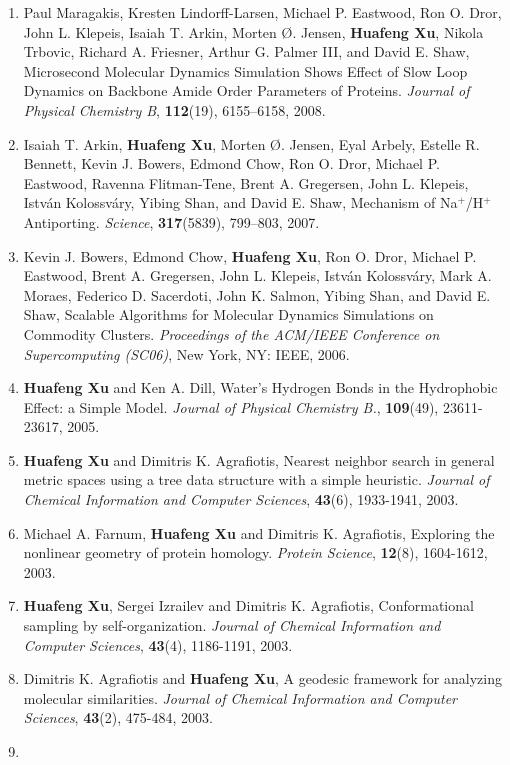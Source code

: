 \documentclass[11pt]{article}
\begin{document}
\begin{enumerate}
\item
Paul Maragakis, Kresten Lindorff-Larsen, Michael P. Eastwood, Ron O. Dror, John L. Klepeis, Isaiah T. Arkin, Morten \O. Jensen, \textbf{Huafeng Xu}, Nikola Trbovic, Richard A. Friesner, Arthur G. Palmer III, and David E. Shaw, Microsecond Molecular Dynamics Simulation Shows Effect of Slow Loop Dynamics on Backbone Amide Order Parameters of Proteins. \textit{Journal of Physical Chemistry B}, \textbf{112}(19), 6155–6158, 2008.
\item
Isaiah T. Arkin, \textbf{Huafeng Xu}, Morten \O. Jensen, Eyal Arbely, Estelle R. Bennett, Kevin J. Bowers, Edmond Chow, Ron O. Dror, Michael P. Eastwood, Ravenna Flitman-Tene, Brent A. Gregersen, John L. Klepeis, István Kolossváry, Yibing Shan, and David E. Shaw, Mechanism of Na$^+$/H$^+$ Antiporting. \textit{Science}, \textbf{317}(5839), 799–803, 2007.
\item
Kevin J. Bowers, Edmond Chow, \textbf{Huafeng Xu}, Ron O. Dror, Michael P. Eastwood, Brent A. Gregersen, John L. Klepeis, István Kolossváry, Mark A. Moraes, Federico D. Sacerdoti, John K. Salmon, Yibing Shan, and David E. Shaw, Scalable Algorithms for Molecular Dynamics Simulations on Commodity Clusters. \textit{Proceedings of the ACM/IEEE Conference on Supercomputing (SC06)}, New York, NY: IEEE, 2006.
\item
\textbf{Huafeng Xu} and Ken A. Dill, Water's Hydrogen Bonds in the Hydrophobic Effect: a Simple Model. \textit{Journal of Physical Chemistry B.}, \textbf{109}(49), 23611-23617, 2005.
\item
\textbf{Huafeng Xu} and Dimitris K. Agrafiotis, Nearest neighbor search in general metric spaces using a tree data structure with a simple heuristic. \textit{Journal of Chemical Information and Computer Sciences}, \textbf{43}(6), 1933-1941, 2003.
\item
Michael A. Farnum, \textbf{Huafeng Xu} and Dimitris K. Agrafiotis, Exploring the nonlinear geometry of protein homology. \textit{Protein Science}, \textbf{12}(8), 1604-1612, 2003.
\item
\textbf{Huafeng Xu}, Sergei Izrailev and Dimitris K. Agrafiotis, Conformational sampling by self-organization. \textit{Journal of Chemical Information and Computer Sciences}, \textbf{43}(4), 1186-1191, 2003.
\item
Dimitris K. Agrafiotis and \textbf{Huafeng Xu}, A geodesic framework for analyzing molecular similarities. \textit{Journal of Chemical Information and Computer Sciences}, \textbf{43}(2), 475-484, 2003.
\item

\end{enumerate}
\end{document}
